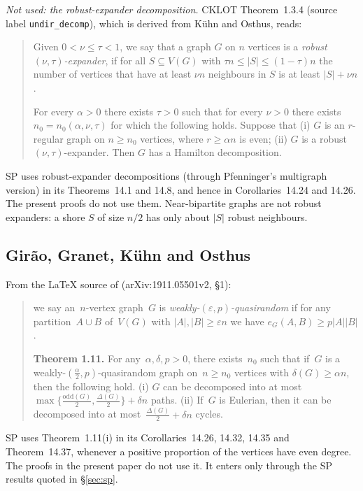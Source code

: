 \documentclass[11pt]{article}
\theoremstyle{definition}
\begin{document}
\noindent\emph{Not used: the robust-expander decomposition.} CKLOT Theorem~1.3.4 (source label \texttt{undir\_decomp}), which is derived from K\"uhn and Osthus, reads:
\begin{quote}
Given $0<\nu \leq \tau<1$, we say that a graph $G$ on $n$ vertices is a \emph{robust $(\nu, \tau)$-expander}, if for all $S\subseteq V(G)$ with $\tau n\le |S|\le (1-\tau)n$ the number of vertices that have at least $\nu n$ neighbours in $S$ is at least $|S|+\nu n$.

For every $ \alpha >0$ there exists $\tau>0$ such that for every $\nu> 0$ there exists $n_0=n_0 (\alpha,\nu,\tau)$ for which the following holds. Suppose that (i) $G$ is an $r$-regular graph on $n \ge n_0$ vertices, where $r\ge \alpha n$ is even; (ii) $G$ is a robust $(\nu,\tau)$-expander. Then $G$ has a Hamilton decomposition.
\end{quote}
SP uses robust-expander decompositions (through Pfenninger's multigraph version) in its Theorems~14.1 and 14.8, and hence in Corollaries~14.24 and 14.26. The present proofs do not use them. Near-bipartite graphs are not robust expanders: a shore $S$ of size $n/2$ has only about $|S|$ robust neighbours.

\subsection{Gir\~ao, Granet, K\"uhn and Osthus}
From the LaTeX source of \cite{GGKO} (arXiv:1911.05501v2, \S1):
\begin{quote}
we say an~$n$-vertex graph~$G$ is \emph{weakly-$(\varepsilon, p)$-quasirandom} if for any partition~$A\cup B$ of~$V(G)$ with $|A|, |B|\geq \varepsilon n$ we have $e_G(A, B)\geq p|A||B|$.

\textbf{Theorem 1.11.} For any~$\alpha,\delta, p>0$, there exists~$n_0$ such that if~$G$ is a weakly-$(\frac{\alpha}{2},p)$-quasirandom graph on~$n\geq n_0$ vertices with $\delta(G)\geq \alpha n$, then the following hold. (i) $G$ can be decomposed into at most~$\max\{ \frac{\mathrm{odd}(G)}{2},\frac{\Delta(G)}{2}\} +\delta n$ paths. (ii) If~$G$ is Eulerian, then it can be decomposed into at most~$\frac{\Delta(G)}{2} +\delta n$ cycles.
\end{quote}
SP uses Theorem~1.11(i) in its Corollaries~14.26, 14.32, 14.35 and Theorem~14.37, whenever a positive proportion of the vertices have even degree. The proofs in the present paper do not use it. It enters only through the SP results quoted in \S\ref{sec:sp}.
\end{document}
